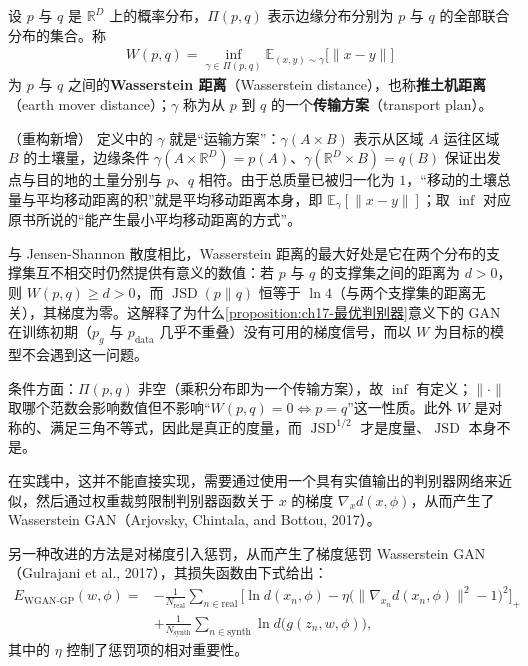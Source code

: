 \documentclass[../../main.tex]{subfiles}
\begin{document}
\begin{definition}[Wasserstein 距离]\label{definition:ch17-Wasserstein距离}
设 $p$ 与 $q$ 是 $\mathbb{R}^D$ 上的概率分布，$\Pi(p,q)$ 表示边缘分布分别为 $p$ 与 $q$ 的全部联合分布的集合。称
\begin{align*}
W(p,q)=\inf_{\gamma\in\Pi(p,q)}\mathbb{E}_{(x,y)\sim\gamma}\big[\|x-y\|\big]
\end{align*}
为 $p$ 与 $q$ 之间的\textbf{Wasserstein 距离}（Wasserstein distance），也称\textbf{推土机距离}（earth mover distance）；$\gamma$ 称为从 $p$ 到 $q$ 的一个\textbf{传输方案}（transport plan）。
\end{definition}

\begin{remark}（重构新增）
定义中的 $\gamma$ 就是“运输方案”：$\gamma(A\times B)$ 表示从区域 $A$ 运往区域 $B$ 的土壤量，边缘条件 $\gamma(A\times\mathbb{R}^D)=p(A)$、$\gamma(\mathbb{R}^D\times B)=q(B)$ 保证出发点与目的地的土量分别与 $p$、$q$ 相符。由于总质量已被归一化为 $1$，“移动的土壤总量与平均移动距离的积”就是平均移动距离本身，即 $\mathbb{E}_\gamma[\|x-y\|]$；取 $\inf$ 对应原书所说的“能产生最小平均移动距离的方式”。

与 Jensen-Shannon 散度相比，Wasserstein 距离的最大好处是它在两个分布的支撑集互不相交时仍然提供有意义的数值：若 $p$ 与 $q$ 的支撑集之间的距离为 $d>0$，则 $W(p,q)\geqslant d>0$，而 $\operatorname{JSD}(p\|q)$ 恒等于 $\ln 4$（与两个支撑集的距离无关），其梯度为零。这解释了为什么\cref{proposition:ch17-最优判别器}意义下的 GAN 在训练初期（$p_g$ 与 $p_{\mathrm{data}}$ 几乎不重叠）没有可用的梯度信号，而以 $W$ 为目标的模型不会遇到这一问题。

条件方面：$\Pi(p,q)$ 非空（乘积分布即为一个传输方案），故 $\inf$ 有定义；$\|\cdot\|$ 取哪个范数会影响数值但不影响“$W(p,q)=0\iff p=q$”这一性质。此外 $W$ 是对称的、满足三角不等式，因此是真正的度量，而 $\operatorname{JSD}^{1/2}$ 才是度量、$\operatorname{JSD}$ 本身不是。
\end{remark}

在实践中，这并不能直接实现，需要通过使用一个具有实值输出的判别器网络来近似，然后通过权重裁剪限制判别器函数关于 $x$ 的梯度 $\nabla_x d(x,\phi)$，从而产生了 Wasserstein GAN（Arjovsky, Chintala, and Bottou, 2017）。

另一种改进的方法是对梯度引入惩罚，从而产生了梯度惩罚 Wasserstein GAN（Gulrajani et al., 2017），其损失函数由下式给出：
\begin{align}
E_{\mathrm{WGAN}\text{-}\mathrm{GP}}(w,\phi)={}&-\frac{1}{N_{\mathrm{real}}}\sum_{n\in\mathrm{real}}\Big[\ln d(x_n,\phi)-\eta\big(\|\nabla_{x_n}d(x_n,\phi)\|^{2}-1\big)^{2}\Big]_{+}\nonumber\\
&+\frac{1}{N_{\mathrm{synth}}}\sum_{n\in\mathrm{synth}}\ln d\big(g(z_n,w,\phi)\big),
\label{align:ch17-WGAN-GP}
\end{align}
其中的 $\eta$ 控制了惩罚项的相对重要性。
\end{document}
